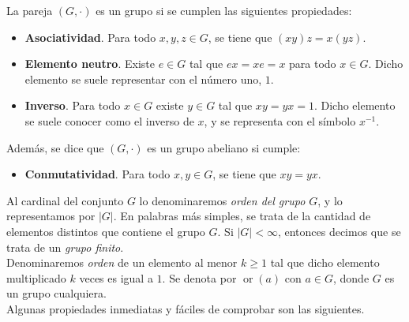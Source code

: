 \begin{definicion}
	La pareja $(G, \cdot)$ es un grupo si se cumplen las siguientes propiedades:
	
	\begin{itemize}
		\item \textbf{Asociatividad}. Para todo $x, y, z \in G$, se tiene que $(xy)z = x(yz)$.
		
		\item \textbf{Elemento neutro}. Existe $e \in G$ tal que $ex = xe = x$ para todo $x \in G$. Dicho elemento se suele representar con el número uno, $1$.
		
		\item \textbf{Inverso}. Para todo $x \in G$ existe $y \in G$ tal que $xy = yx = 1$. Dicho elemento se suele conocer como el inverso de $x$, y se representa con el símbolo $x^{-1}$.
	\end{itemize}
	
	Además, se dice que $(G, \cdot)$ es un grupo abeliano si cumple:
	
	\begin{itemize}
		\item \textbf{Conmutatividad}. Para todo $x, y \in G$, se tiene que $xy = yx$.
	\end{itemize}
\end{definicion}

Al cardinal del conjunto $G$ lo denominaremos \textit{orden del grupo $G$}, y lo representamos por $|G|$. En palabras más simples, se trata de la cantidad de elementos distintos que contiene el grupo $G$. Si $|G| < \infty$, entonces decimos que se trata de un \textit{grupo finito}.\\

Denominaremos \textit{orden} de un elemento al menor $k \geq 1$ tal que dicho elemento multiplicado $k$ veces es igual a $1$. Se denota por $\mathop{or}(a)$ con $a \in G$, donde $G$ es un grupo cualquiera.\\

Algunas propiedades inmediatas y fáciles de comprobar son las siguientes.

